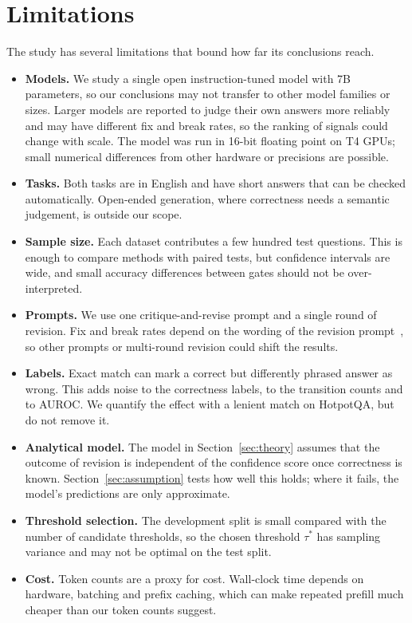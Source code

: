 \section{Limitations}
\label{sec:limitations}

The study has several limitations that bound how far its conclusions reach.
\begin{itemize}
    \item \textbf{Models.} We study a single open instruction-tuned model with 7B parameters, so our conclusions may not transfer to other model families or sizes. Larger models are reported to judge their own answers more reliably~\cite{kadavath2022language} and may have different fix and break rates, so the ranking of signals could change with scale. The model was run in 16-bit floating point on T4 GPUs; small numerical differences from other hardware or precisions are possible.
    \item \textbf{Tasks.} Both tasks are in English and have short answers that can be checked automatically. Open-ended generation, where correctness needs a semantic judgement, is outside our scope.
    \item \textbf{Sample size.} Each dataset contributes a few hundred test questions. This is enough to compare methods with paired tests, but confidence intervals are wide, and small accuracy differences between gates should not be over-interpreted.
    \item \textbf{Prompts.} We use one critique-and-revise prompt and a single round of revision. Fix and break rates depend on the wording of the revision prompt~\cite{yang2024confidence}, so other prompts or multi-round revision could shift the results.
    \item \textbf{Labels.} Exact match can mark a correct but differently phrased answer as wrong. This adds noise to the correctness labels, to the transition counts and to AUROC. We quantify the effect with a lenient match on HotpotQA, but do not remove it.
    \item \textbf{Analytical model.} The model in Section~\ref{sec:theory} assumes that the outcome of revision is independent of the confidence score once correctness is known. Section~\ref{sec:assumption} tests how well this holds; where it fails, the model's predictions are only approximate.
    \item \textbf{Threshold selection.} The development split is small compared with the number of candidate thresholds, so the chosen threshold $\tau^*$ has sampling variance and may not be optimal on the test split.
    \item \textbf{Cost.} Token counts are a proxy for cost. Wall-clock time depends on hardware, batching and prefix caching, which can make repeated prefill much cheaper than our token counts suggest.
\end{itemize}
